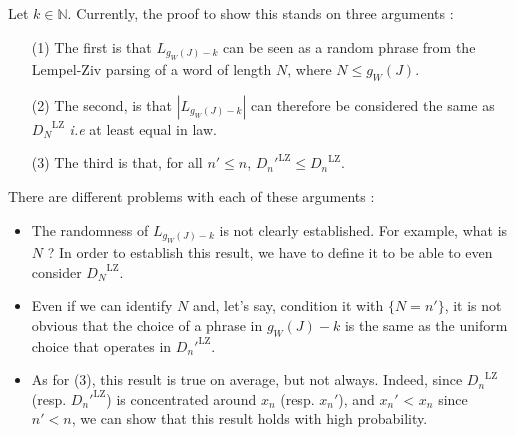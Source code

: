 \noindent
Let $k \in\mathbb{N}$.
Currently, the proof to show this stands on three arguments :

\begin{itemize}
    \item[(1)] The first is that $L_{g_W(J)-k}$ can be seen as 
          a random phrase from the Lempel-Ziv parsing of 
          a word of length $N$, where $N \leq g_W(J)$.

    \item[(2)] The second, is that $|L_{g_W(J)-k}|$ can 
          therefore be considered the same as ${D_N}^{\text{LZ}}$
          \textit{i.e} at least equal in law.

    \item[(3)] The third is that, for all $n'\leq n$, 
        ${D_n'}^{\text{LZ}} \leq {D_n}^{\text{LZ}}$.
\end{itemize}

There are different problems with each of these arguments :

\begin{itemize}
    \item The randomness of $L_{g_W(J)-k}$ is not clearly
          established. For example, what is $N$ ? In order
          to establish this result, we have to define it
          to be able to even consider ${D_N}^{\text{LZ}}$.

    \item Even if we can identify $N$ and, let's say,
          condition it with $\{ N = n' \}$, it is not obvious
          that the choice of a phrase in ${g_W(J)-k}$
          is the same as the uniform choice that operates
          in ${D_n'}^{\text{LZ}}$.

    \item As for (3), this result is true on average, but 
          not always. Indeed, since ${D_n}^{\text{LZ}}$
          (resp. ${D_n'}^{\text{LZ}}$) is concentrated
          around $x_n$ (resp. $x_n'$), and $x_n'$ < $x_n$
          since $n' < n$, we can show 
          that this result holds with high probability.
\end{itemize}